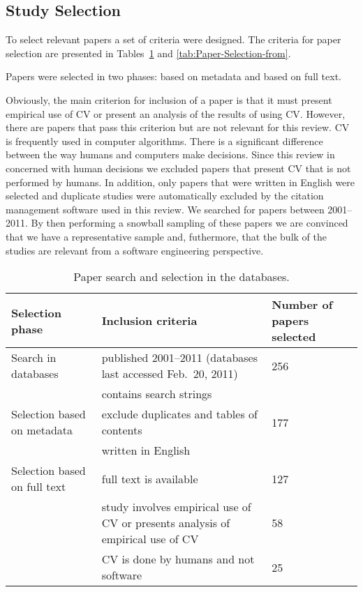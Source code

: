 \subsection{Study Selection}
To select relevant papers a set of criteria were designed. The criteria for paper selection are presented in Tables~\ref{tab:Paper-search-and} and \ref{tab:Paper-Selection-from}.

Papers were selected in two phases: based on metadata and based on full text.

Obviously, the main criterion for inclusion of a paper is that it must present empirical use of CV or present an analysis of the results of using CV. However, there are papers that pass this criterion but are not relevant for this review. CV is frequently used in computer algorithms. There is a significant difference between the way humans and computers make decisions. Since this review in concerned with human decisions we excluded papers that present CV that is not performed by humans. In addition, only papers that were written in English were selected and duplicate studies were automatically excluded by the citation management software used in this review. We searched for papers between 2001--2011. By then performing a snowball sampling of these papers we are convinced that we have a representative sample and, futhermore, that the bulk of the studies are relevant from a software engineering perspective.


\begin{table}
	\scriptsize
\caption{\label{tab:Paper-search-and}Paper search and selection in the databases.}

\begin{tabular}{|>{\raggedright}p{}|>{\raggedright}p{}|>{\raggedright}p{}|}
\hline
Selection phase & Inclusion criteria & Number of papers selected\tabularnewline
\hline \hline

Search in databases & published 2001--2011 (databases last accessed Feb.\ 20, 2011) & 256 \tabularnewline
\cline{2-2}
& contains search strings & \tabularnewline
\hline 

Selection based on metadata & exclude duplicates and tables of contents& 177 \tabularnewline
\cline{2-2}
&  written in English  & \tabularnewline
\hline

Selection based on full text & full text is available & 127 \tabularnewline
\cline{2-3}
& study involves empirical use of CV or presents analysis of empirical use of CV & 58 \tabularnewline
\cline{2-3}
& CV is done by humans and not software & 25 \tabularnewline
\hline
\end{tabular}%
\end{table}

